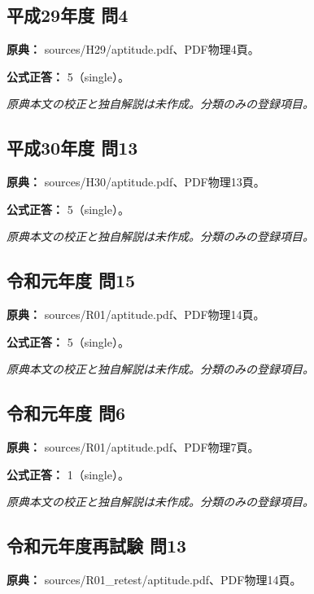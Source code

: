 \subsection{平成29年度 問4}
\label{q:h29-reg-apt-04}

\noindent\textbf{原典：} sources/H29/aptitude.pdf、PDF物理4頁。

\textbf{公式正答：} 5（single）。

\par\textit{原典本文の校正と独自解説は未作成。分類のみの登録項目。}

\subsection{平成30年度 問13}
\label{q:h30-reg-apt-13}

\noindent\textbf{原典：} sources/H30/aptitude.pdf、PDF物理13頁。

\textbf{公式正答：} 5（single）。

\par\textit{原典本文の校正と独自解説は未作成。分類のみの登録項目。}

\subsection{令和元年度 問15}
\label{q:r01-reg-apt-15}

\noindent\textbf{原典：} sources/R01/aptitude.pdf、PDF物理14頁。

\textbf{公式正答：} 5（single）。

\par\textit{原典本文の校正と独自解説は未作成。分類のみの登録項目。}

\subsection{令和元年度 問6}
\label{q:r01-reg-apt-06}

\noindent\textbf{原典：} sources/R01/aptitude.pdf、PDF物理7頁。

\textbf{公式正答：} 1（single）。

\par\textit{原典本文の校正と独自解説は未作成。分類のみの登録項目。}

\subsection{令和元年度再試験 問13}
\label{q:r01-ret-apt-13}

\noindent\textbf{原典：} sources/R01\_retest/aptitude.pdf、PDF物理14頁。

